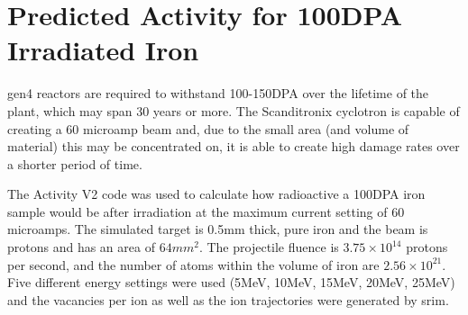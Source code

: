 \FloatBarrier


\section[100DPA Predicted Activity]{Predicted Activity for 100DPA Irradiated Iron}

\Acrlong{gen4} reactors are required to withstand 100-150DPA over the lifetime of the plant, which may span 30 years or more.  The Scanditronix cyclotron is capable of creating a 60 microamp beam and, due to the small area (and volume of material) this may be concentrated on, it is able to create high damage rates over a shorter period of time.

The Activity V2 code was used to calculate how radioactive a 100DPA iron sample would be after irradiation at the maximum current setting of 60 microamps.  The simulated target is 0.5mm thick, pure iron and the beam is protons and has an area of $64mm^2$.  The projectile fluence is $3.75 \times 10^{14}$ protons per second, and the number of atoms within the volume of iron are $2.56 \times 10^{21}$.  Five different energy settings were used (5MeV, 10MeV, 15MeV, 20MeV, 25MeV) and the vacancies per ion as well as the ion trajectories were generated by \acrshort{srim}.


